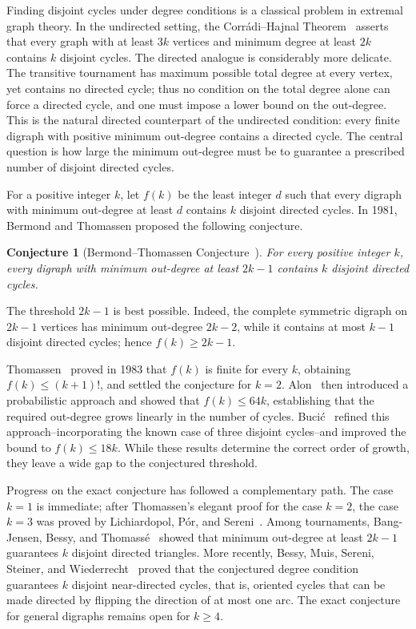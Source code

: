 \documentclass[10pt,a4paper]{article}
\newtheorem{conjecture}[theorem]{Conjecture}
\numberwithin{equation}{section}
\begin{document}
Finding disjoint cycles under degree conditions is a classical problem
in extremal graph theory. In the undirected setting, the
Corr\'adi--Hajnal Theorem~\cite{corradiAMASH14} asserts that every graph with at
least $3k$ vertices and minimum degree at least $2k$ contains $k$
disjoint cycles. The directed analogue is considerably more delicate.
The transitive tournament has 
maximum possible total degree at every vertex, yet contains no directed
cycle; thus no condition on the total degree alone can force a directed
cycle, and one must impose a lower bound on the out-degree. This is the
natural directed counterpart of the undirected condition: every finite
digraph with positive minimum out-degree contains a directed cycle. The
central question is how large the minimum out-degree must be to
guarantee a prescribed number of disjoint directed cycles.


For a positive integer $k$, let $f(k)$ be the least integer $d$ such
that every digraph with minimum out-degree at least $d$ contains $k$
disjoint directed cycles. In 1981, Bermond and
Thomassen proposed the following conjecture.



\begin{conjecture}[Bermond--Thomassen Conjecture~\cite{bermondJGT5}]
For every positive integer $k$, every digraph with minimum out-degree
at least $2k-1$ contains $k$ disjoint directed cycles.
\end{conjecture}


The threshold $2k-1$ is best possible. Indeed, the complete symmetric
digraph on $2k-1$ vertices has minimum out-degree $2k-2$, while it contains at most
$k-1$ disjoint directed cycles; hence $f(k)\ge2k-1$. 



Thomassen~\cite{thomassenC3} proved in 1983 that $f(k)$ is finite for every
$k$, obtaining $f(k)\le(k+1)!$, and settled the conjecture for $k=2$.
Alon~\cite{alonJCTB68} then introduced a probabilistic approach and showed
that $f(k)\le64k$, establishing that the required out-degree grows
linearly in the number of cycles. Buci\'c~\cite{bucicDM341} refined this
approach--incorporating the known case of three disjoint cycles--and
improved the bound to $f(k)\le18k$. While these results determine the
correct order of growth, they leave a wide gap to the conjectured
threshold.



Progress on the exact conjecture has followed a complementary path. The
case $k=1$ is immediate; after Thomassen's elegant proof for the case $k=2$, the case $k=3$
was proved by Lichiardopol, P\'or, and Sereni~\cite{lichiardopolSJDM23}. Among
tournaments, Bang-Jensen, Bessy, and Thomass\'e~\cite{bangjensenJGT75} showed
that minimum out-degree at least $2k-1$ guarantees $k$ disjoint
directed triangles. More recently, Bessy, Muis, Sereni, Steiner, and
Wiederrecht~\cite{bessyARX26} proved that the conjectured degree condition
guarantees $k$ disjoint near-directed cycles, that is, oriented cycles that can be made directed by flipping the direction of at most one arc. The exact conjecture for
general digraphs remains open for $k\ge4$.
\end{document}
